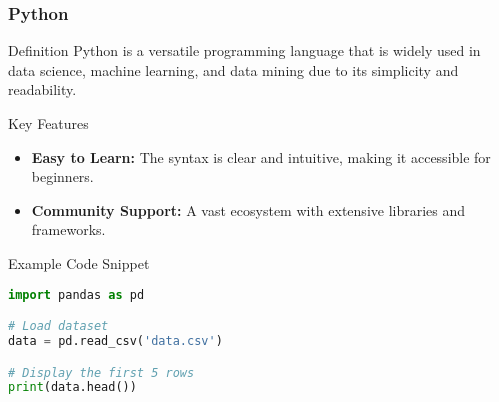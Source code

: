 \documentclass[aspectratio=169]{beamer}
\begin{document}
\begin{frame}[fragile]
  \frametitle{Python}
  \begin{block}{Definition}
    Python is a versatile programming language that is widely used in data science, machine learning, and data mining due to its simplicity and readability.
  \end{block}
  
  \begin{block}{Key Features}
    \begin{itemize}
      \item \textbf{Easy to Learn:} The syntax is clear and intuitive, making it accessible for beginners.
      \item \textbf{Community Support:} A vast ecosystem with extensive libraries and frameworks.
    \end{itemize}
  \end{block}
  
  \begin{block}{Example Code Snippet}
    \begin{lstlisting}[language=python]
import pandas as pd

# Load dataset
data = pd.read_csv('data.csv')

# Display the first 5 rows
print(data.head())
    \end{lstlisting}
  \end{block}
\end{frame}
\end{document}
